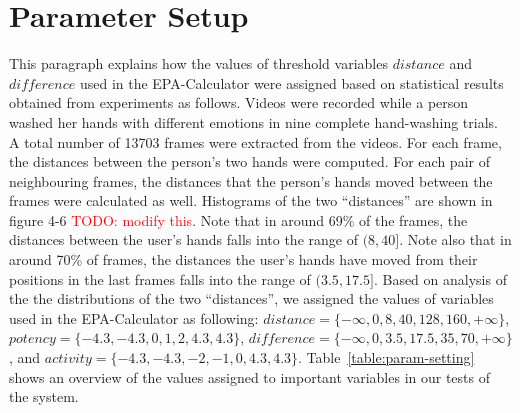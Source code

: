 \section{Parameter Setup}
This paragraph explains how the values of threshold variables $distance$ and $difference$ used in the EPA-Calculator were assigned based on statistical results obtained from experiments as follows. Videos were recorded while a person washed her hands with different emotions in nine complete hand-washing trials. A total number of 13703 frames were extracted from the videos. For each frame, the distances between the person's two hands were computed. For each pair of neighbouring frames, the distances that the person's hands moved between the frames were calculated as well. Histograms of the two ``distances'' are shown in figure 4-6 \textcolor{red}{TODO: modify this}. Note that in around 69\% of the frames, the distances between the user's hands falls into the range of $(8, 40]$. Note also that in around 70\% of frames, the distances the user's hands have moved from their positions in the last frames falls into the range of $(3.5, 17.5]$. Based on analysis of the the distributions of the two ``distances'', we assigned the values of variables used in the EPA-Calculator as following: $distance = \{-\infty, 0, 8, 40, 128, 160, +\infty\}$, $potency = \{-4.3, -4.3, 0, 1, 2, 4.3, 4.3\}$, $difference = \{-\infty, 0, 3.5, 17.5, 35, 70, +\infty\}$, and $activity = \{-4.3, -4.3, -2, -1, 0, 4.3, 4.3\}$. Table~\ref{table:param-setting} shows an overview of the values assigned to important variables in our tests of the system. 

%

